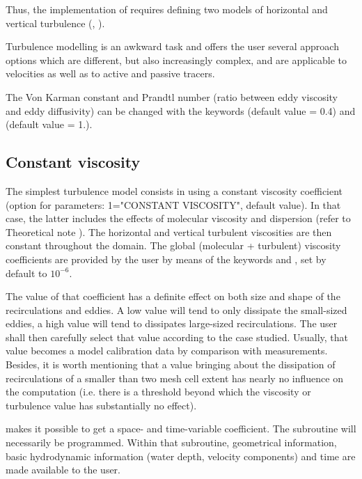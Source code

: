 Thus, the implementation of  requires defining two models of
horizontal and vertical turbulence (,
).

Turbulence modelling is an awkward task and  offers the user several
approach options which are different, but also increasingly complex, and are
applicable to velocities as well as to active and passive tracers.

The Von Karman constant and Prandtl number (ratio between eddy viscosity and
eddy diffusivity) can be changed with the keywords 
(default value = 0.4) and  (default value = 1.).

\subsection{Constant viscosity}

The simplest turbulence model consists in using a constant viscosity
coefficient (option for parameters: 1="CONSTANT VISCOSITY", default value). In
that case, the latter includes the effects of molecular viscosity and
dispersion (refer to Theoretical note \cite{Hervouet2007}).
The horizontal and vertical
turbulent viscosities are then constant throughout the domain. The global
(molecular + turbulent) viscosity coefficients are provided by the user by
means of the keywords  and , set
by default to $10^{-6}$.

The value of that coefficient has a definite effect on both size and shape of
the recirculations and eddies. A low value will tend to only dissipate the
small-sized eddies, a high value will tend to dissipates large-sized
recirculations. The user shall then carefully select that value according to
the case studied. Usually, that value becomes a model calibration data by
comparison with measurements. Besides, it is worth mentioning that a value
bringing about the dissipation of recirculations of a smaller than two mesh
cell extent has nearly no influence on the computation (i.e. there is a
threshold beyond which the viscosity or turbulence value has substantially no
effect).

 makes it possible to get a space- and time-variable coefficient.
The  subroutine will necessarily be programmed.
Within that subroutine, geometrical information, basic hydrodynamic
information (water depth, velocity components) and time are made available
to the user.

